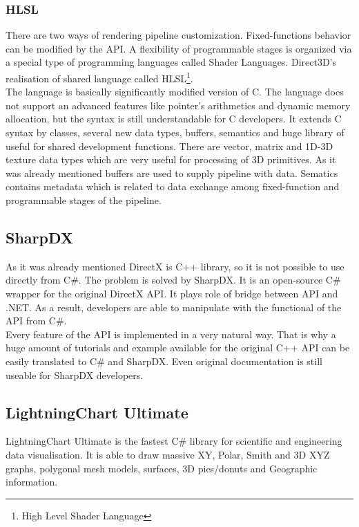 \documentclass[twoside, english, 11pt]{report}
\begin{document}
\subsubsection{HLSL}
There are two ways of rendering pipeline customization. Fixed-functions behavior can be modified by the API. A flexibility of programmable stages  is organized via a special type of programming languages called Shader Languages. Direct3D's realisation of shared language called HLSL\footnote{High Level Shader Language}.\\

The language is basically significantly modified version of C. The language does not support an advanced features like pointer's arithmetics and dynamic memory allocation, but the syntax is still understandable for C developers. It extends C syntax by classes, several new data types, buffers, semantics and huge library of useful for shared development functions. There are vector, matrix and 1D-3D texture data types which are very useful for processing of 3D primitives. As it was already mentioned buffers are used to supply pipeline with data. Sematics contains metadata which is related to data exchange among fixed-function and programmable stages of the pipeline.
\subsection{SharpDX}

As it was already mentioned DirectX is C++ library, so it is not possible to use directly from C\#. The problem is solved by SharpDX. It is an open-source C\# wrapper for the original DirectX API. It plays role of bridge between API and .NET. As a result, developers are able to manipulate with the functional of the API from C\#.\\
Every feature of the API is implemented in a very natural way. That is why a huge amount of tutorials and example available for the original C++ API can be easily translated to C\# and SharpDX. Even original documentation is still useable for SharpDX developers.

\subsection{LightningChart Ultimate}

LightningChart Ultimate is the fastest C\# library for scientific and engineering data visualisation. It is able to draw massive XY, Polar, Smith and 3D XYZ graphs, polygonal mesh models, surfaces, 3D pies/donuts and Geographic information. 
\end{document}

